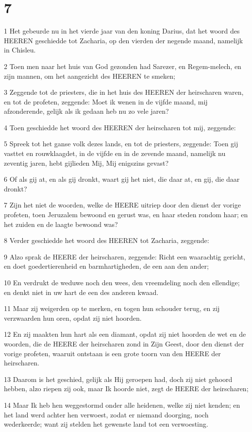 \chapter{7}

\par 1 Het gebeurde nu in het vierde jaar van den koning Darius, dat het woord des HEEREN geschiedde tot Zacharia, op den vierden der negende maand, namelijk in Chisleu.
\par 2 Toen men naar het huis van God gezonden had Sarezer, en Regem-melech, en zijn mannen, om het aangezicht des HEEREN te smeken;
\par 3 Zeggende tot de priesters, die in het huis des HEEREN der heirscharen waren, en tot de profeten, zeggende: Moet ik wenen in de vijfde maand, mij afzonderende, gelijk als ik gedaan heb nu zo vele jaren?
\par 4 Toen geschiedde het woord des HEEREN der heirscharen tot mij, zeggende:
\par 5 Spreek tot het ganse volk dezes lands, en tot de priesters, zeggende: Toen gij vasttet en rouwklaagdet, in de vijfde en in de zevende maand, namelijk nu zeventig jaren, hebt gijlieden Mij, Mij enigszins gevast?
\par 6 Of als gij at, en als gij dronkt, waart gij het niet, die daar at, en gij, die daar dronkt?
\par 7 Zijn het niet de woorden, welke de HEERE uitriep door den dienst der vorige profeten, toen Jeruzalem bewoond en gerust was, en haar steden rondom haar; en het zuiden en de laagte bewoond was?
\par 8 Verder geschiedde het woord des HEEREN tot Zacharia, zeggende:
\par 9 Alzo sprak de HEERE der heirscharen, zeggende: Richt een waarachtig gericht, en doet goedertierenheid en barmhartigheden, de een aan den ander;
\par 10 En verdrukt de weduwe noch den wees, den vreemdeling noch den ellendige; en denkt niet in uw hart de een des anderen kwaad.
\par 11 Maar zij weigerden op te merken, en togen hun schouder terug, en zij verzwaarden hun oren, opdat zij niet hoorden.
\par 12 En zij maakten hun hart als een diamant, opdat zij niet hoorden de wet en de woorden, die de HEERE der heirscharen zond in Zijn Geest, door den dienst der vorige profeten, waaruit ontstaan is een grote toorn van den HEERE der heirscharen.
\par 13 Daarom is het geschied, gelijk als Hij geroepen had, doch zij niet gehoord hebben, alzo riepen zij ook, maar Ik hoorde niet, zegt de HEERE der heirscharen;
\par 14 Maar Ik heb hen weggestormd onder alle heidenen, welke zij niet kenden; en het land werd achter hen verwoest, zodat er niemand doorging, noch wederkeerde; want zij stelden het gewenste land tot een verwoesting.

